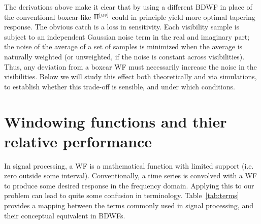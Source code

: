 \documentclass[useAMS,usenatbib]{mn2e}
\begin{document}
The derivations above make it clear that by using a different BDWF in place of the conventional boxcar-like $\Pi^{[uv]}$ 
could in principle yield more optimal tapering response. The obvious catch is a loss in 
sensitivity. Each visibility sample is subject to an independent Gaussian noise term in the real and imaginary part; the noise of
the average of a set of samples is minimized when the average is naturally weighted (or unweighted, if the noise is 
constant across visibilities). Thus, any deviation from a boxcar WF must necessarily increase the noise in the 
visibilities. Below we will study this effect both theoretically and via simulations, to establish whether this 
trade-off is sensible, and under which conditions.

\section{Windowing functions and thier relative performance}
\label{subsec:Windowing functions}

In signal processing, a WF is a mathematical function with limited support (i.e. zero outside some interval). Conventionally,
a time series is convolved with a WF to produce some desired response in the frequency domain. Applying this to our problem
can lead to quite some confusion in terminology. Table~\ref{tab:terms} provides a mapping between the terms commonly used in signal processing, 
and their conceptual equivalent in BDWFs.
\end{document}

